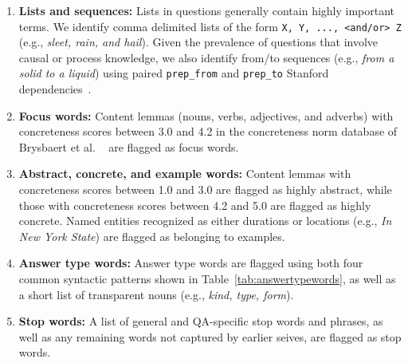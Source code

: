 \begin{enumerate}

\item {\bf Lists and sequences:} Lists in questions generally contain highly important terms.  We identify comma delimited lists of the form {\small {\tt X, Y, ..., <and/or> Z}} (e.g., {\em sleet, rain, and hail}). Given the prevalence of questions that involve causal or process knowledge, we also identify from/to sequences (e.g., {\em from a solid to a liquid}) using paired {\tt prep\_from} and {\tt prep\_to} Stanford dependencies~\cite{de2008stanford}. 

\item {\bf Focus words:} Content lemmas (nouns, verbs, adjectives, and adverbs) with concreteness scores between 3.0 and 4.2 in the concreteness norm database of Brysbaert et al. ~\citeyear{brysbaert:2014} are flagged as focus words. 

\item {\bf Abstract, concrete, and example words:} Content lemmas with concreteness scores between 1.0 and 3.0 are flagged as highly abstract, while those with concreteness scores between 4.2 and 5.0 are flagged as highly concrete.  Named entities recognized as either durations or locations (e.g., {\em In New York State}) are flagged as belonging to examples.  

\item {\bf Answer type words:} Answer type words are flagged using both four common syntactic patterns shown in Table~\ref{tab:answertypewords}, as well as a short list of transparent nouns (e.g., {\em kind, type, form}). 

\item {\bf Stop words: } A list of general and QA-specific stop words and phrases, as well as any remaining words not captured by earlier seives, are flagged as stop words.

\end{enumerate}

